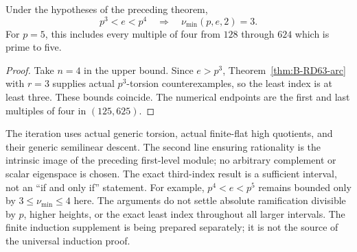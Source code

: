 \begin{corollary}
\label{cor:B-RD74-third-index}
Under the hypotheses of the preceding theorem,
\[
 p^3<e<p^4\quad\Longrightarrow\quad
 \boxed{\nu_{\min}(p,e,2)=3}.
 \tag{B-RD74.10}
\]
For \(p=5\), this includes every multiple of four from
\(128\) through \(624\) which is prime to five.
\end{corollary}
\begin{proof}
Take \(n=4\) in the upper bound. Since \(e>p^3\),
Theorem~\ref{thm:B-RD63-arc} with \(r=3\) supplies actual
\(p^3\)-torsion counterexamples, so the least index is at
least three. These bounds coincide. The numerical endpoints
are the first and last multiples of four in \((125,625)\).
\end{proof}

\begin{remark}
\label{rem:B-RD74-scope}
The iteration uses actual generic torsion, actual finite-flat
high quotients, and their generic semilinear descent. The
second line ensuring rationality is the intrinsic image of
the preceding first-level module; no arbitrary complement
or scalar eigenspace is chosen. The exact third-index result
is a sufficient interval, not an ``if and only if'' statement.
For example, \(p^4<e<p^5\) remains bounded only by
\(3\le\nu_{\min}\le4\) here. The arguments do not settle
absolute ramification divisible by \(p\), higher heights,
or the exact least index throughout all larger intervals.
The finite induction supplement is being prepared separately;
it is not the source of the universal induction proof.
\end{remark}
